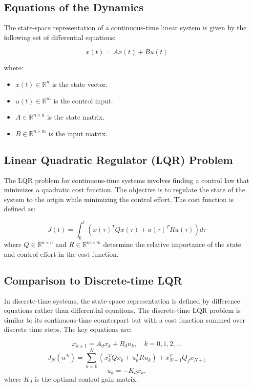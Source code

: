 \documentclass[a4 paper]{article}
\begin{document}
\subsection{Equations of the Dynamics}
The state-space representation of a continuous-time linear system is given by the following set of differential equations:

\begin{equation}
    \dot{x}(t) = A x(t) + B u(t)
\end{equation}

where:
\begin{itemize}
    \item $x(t) \in \mathbb{R}^n$ is the state vector.
    \item $u(t) \in \mathbb{R}^m$ is the control input.
    \item $A \in \mathbb{R}^{n \times n}$ is the state matrix.
    \item $B \in \mathbb{R}^{n \times m}$ is the input matrix.
\end{itemize}

\subsection{Linear Quadratic Regulator (LQR) Problem}
The LQR problem for continuous-time systems involves finding a control law that minimizes a quadratic cost function. 
The objective is to regulate the state of the system to the origin while minimizing the control effort. The cost function is defined as:

\begin{equation} \label{eq:continuous_cost_function}
    J(t) = \int_{0}^{t} \left( x(\tau)^T Q x(\tau) + u(\tau)^T R u(\tau) \right) d\tau
\end{equation}
where $Q \in \mathbb{R}^{n \times n}$ and $R \in \mathbb{R}^{m \times m}$ determine the relative importance of the state and 
control effort in the cost function.


\subsection{Comparison to Discrete-time LQR}
In discrete-time systems, the state-space representation is defined by difference equations rather than differential equations. 
The discrete-time LQR problem is similar to its continuous-time counterpart but with a cost function summed over discrete time steps. 
The key equations are:

\begin{equation}
    x_{k+1} = A_d x_k + B_d u_k, \quad k = 0, 1, 2, \ldots
\end{equation}
\begin{equation}
    J_N(u^N) = \sum_{k=0}^{N} \left( x_k^T Q x_k + u_k^T R u_k \right) + x_{N+1}^T Q_f x_{N+1}
\end{equation}
\begin{equation}
    u_k = -K_d x_k,
\end{equation}
where $K_d$ is the optimal control gain matrix.
\end{document}
